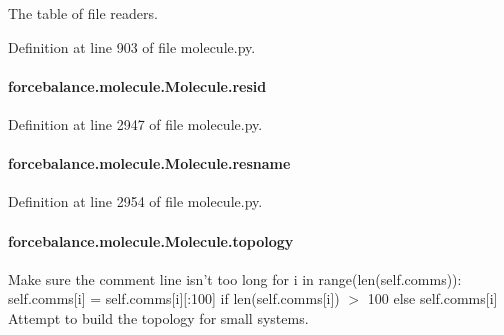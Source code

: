 The table of file readers. 



Definition at line 903 of file molecule.\-py.

\hypertarget{classforcebalance_1_1molecule_1_1Molecule_a7ce0cbbc2f774aaffe3b6ca78b658736}{
\paragraph[{resid}]{\setlength{\rightskip}{0pt plus 5cm}forcebalance.\-molecule.\-Molecule.\-resid}}\label{classforcebalance_1_1molecule_1_1Molecule_a7ce0cbbc2f774aaffe3b6ca78b658736}


Definition at line 2947 of file molecule.\-py.

\hypertarget{classforcebalance_1_1molecule_1_1Molecule_ac1def400d819601483ddf475f1389a8d}{
\paragraph[{resname}]{\setlength{\rightskip}{0pt plus 5cm}forcebalance.\-molecule.\-Molecule.\-resname}}\label{classforcebalance_1_1molecule_1_1Molecule_ac1def400d819601483ddf475f1389a8d}


Definition at line 2954 of file molecule.\-py.

\hypertarget{classforcebalance_1_1molecule_1_1Molecule_a57facdb1b7e71fabfad0df72a7ff94f5}{
\paragraph[{topology}]{\setlength{\rightskip}{0pt plus 5cm}forcebalance.\-molecule.\-Molecule.\-topology}}\label{classforcebalance_1_1molecule_1_1Molecule_a57facdb1b7e71fabfad0df72a7ff94f5}


Make sure the comment line isn't too long for i in range(len(self.\-comms))\-: self.\-comms\mbox{[}i\mbox{]} = self.\-comms\mbox{[}i\mbox{]}\mbox{[}\-:100\mbox{]} if len(self.\-comms\mbox{[}i\mbox{]}) $>$ 100 else self.\-comms\mbox{[}i\mbox{]} Attempt to build the topology for small systems. 

